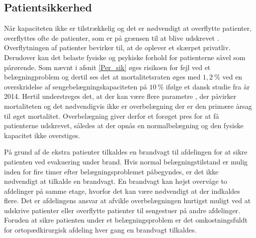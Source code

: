 \subsection{Patientsikkerhed}
Når kapaciteten ikke er tilstrækkelig og det er nødvendigt at overflytte patienter, overflyttes ofte de patienter, som er på grænsen til at blive udskrevet .
\noindent
Overflytningen af patienter bevirker til, at de oplever et skærpet privatliv. \cite{Madsen2014} Derudover kan det belaste fysiske og psykiske forhold for patienterne såvel som pårørende. \cite{Heidmann2014} Som nævnt i afsnit \ref{Per_sik} øges risikoen for fejl ved et belægningproblem og dertil ses det at mortalitetsraten øges med $1,2~\%$ ved en overskridelse af sengebelægningskapaciteten på $10~\%$ ifølge et dansk studie fra år 2014. \cite{Madsen2014} Hertil understreges det, at der kan være flere parametre , der påvirker mortaliteten og det nødvendigvis ikke er overbelægning der er den primære årsag til øget mortalitet. Overbelægning giver derfor et forøget pres for at få patienterne udskrevet, således at der opnås en normalbelægning og  den fysiske kapacitet ikke overstiges.  


På grund af de ekstra patienter tilkaldes en brandvagt til afdelingen for at sikre patienten ved evakuering under brand. Hvis normal belægningstilstand er mulig inden for fire timer efter belægningsproblemet påbegyndes, er det ikke nødvendigt at tilkalde en brandvagt. En brandvagt kan højst overvåge to afdelinger på samme etage, hvorfor det kan være nødvendigt at der indkaldes flere. Det er afdelingens ansvar at afvikle overbelægningen hurtigst muligt ved at udskrive patienter eller overflytte patienter til sengestuer på andre afdelinger. \cite{Beredskab2016} Foruden at sikre patienten under et belægningsproblem er det omkostningsfuldt for ortopædkirurgisk afdeling hver gang en brandvagt tilkaldes.  


